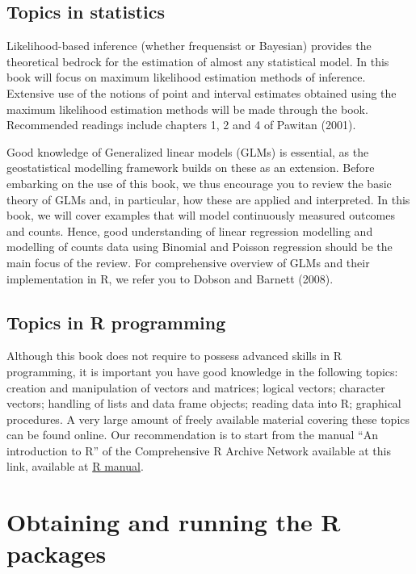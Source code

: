 \documentclass[
  letterpaper,
]{krantz}
\begin{document}
\hypertarget{topics-in-statistics}{%
\subsection{Topics in statistics}\label{topics-in-statistics}}

Likelihood-based inference (whether frequensist or Bayesian) provides
the theoretical bedrock for the estimation of almost any statistical
model. In this book will focus on maximum likelihood estimation methods
of inference. Extensive use of the notions of point and interval
estimates obtained using the maximum likelihood estimation methods will
be made through the book. Recommended readings include chapters 1, 2 and
4 of Pawitan (2001).

Good knowledge of Generalized linear models (GLMs) is essential, as the
geostatistical modelling framework builds on these as an extension.
Before embarking on the use of this book, we thus encourage you to
review the basic theory of GLMs and, in particular, how these are
applied and interpreted. In this book, we will cover examples that will
model continuously measured outcomes and counts. Hence, good
understanding of linear regression modelling and modelling of counts
data using Binomial and Poisson regression should be the main focus of
the review. For comprehensive overview of GLMs and their implementation
in R, we refer you to Dobson and Barnett (2008).

\hypertarget{topics-in-r-programming}{%
\subsection{Topics in R programming}\label{topics-in-r-programming}}

Although this book does not require to possess advanced skills in R
programming, it is important you have good knowledge in the following
topics: creation and manipulation of vectors and matrices; logical
vectors; character vectors; handling of lists and data frame objects;
reading data into R; graphical procedures. A very large amount of freely
available material covering these topics can be found online. Our
recommendation is to start from the manual ``An introduction to R'' of
the Comprehensive R Archive Network available at this link, available at
\href{https://cran.r-project.org/manuals.html}{R manual}.

\hypertarget{obtaining-and-running-the-r-packages}{%
\section{Obtaining and running the R
packages}\label{obtaining-and-running-the-r-packages}}
\end{document}
